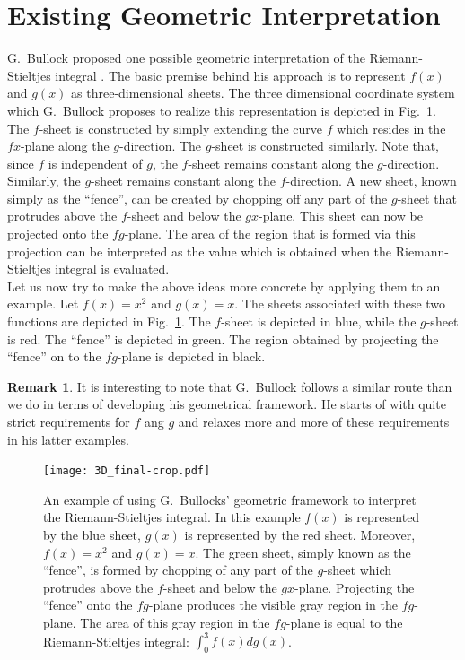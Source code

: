 \documentclass{article}
\theoremstyle{theorem}
\theoremstyle{definition}
\newtheorem*{remark}{Remark}
\begin{document}
\section{Existing Geometric Interpretation}
G.~Bullock proposed one possible geometric interpretation of the Riemann-Stieltjes integral \cite{bullock1988}. 
The basic premise behind his approach is to represent $f(x)$ and $g(x)$ as three-dimensional sheets. 
The three dimensional coordinate system which G.~Bullock proposes to realize this representation is depicted in 
Fig.~\ref{fig:bullock}. The $f$-sheet is constructed by simply extending the curve $f$ which resides in the $fx$-plane 
along the $g$-direction. The $g$-sheet is constructed similarly. Note that, since $f$ is independent of $g$, the $f$-sheet remains 
constant along the $g$-direction. Similarly, the $g$-sheet remains constant along the $f$-direction. 
A new sheet, known simply as the ``fence'', can be created by chopping off any part of the $g$-sheet that protrudes above the 
$f$-sheet and below the $gx$-plane. This sheet can now be projected onto the $fg$-plane. The area of the region that is formed 
via this projection can be interpreted as the value which is obtained when the Riemann-Stieltjes integral is evaluated.\\ 

\noindent
Let us now try to make the above ideas more concrete by applying them to an example. Let $f(x)=x^2$ and 
$g(x)=x$. The sheets associated with these two functions are depicted in Fig.~\ref{fig:bullock}. 
The $f$-sheet is depicted in blue, while the $g$-sheet is red. The ``fence'' is depicted in green. The region
obtained by projecting the ``fence'' on to the $fg$-plane is depicted in black.\\

\noindent
\begin{remark}
It is interesting to note that G.~Bullock follows a similar route than we do in terms of developing his geometrical framework.
He starts of with quite strict requirements for $f$ ang $g$ and relaxes more and more of these requirements in his latter 
examples. 
\end{remark}

\begin{figure}[htb]
\centering
\texttt{[image: 3D\_final-crop.pdf]}
\caption{An example of using G.~Bullocks' geometric framework to interpret the Riemann-Stieltjes integral. In this example 
$f(x)$ is represented by the blue sheet, $g(x)$ is represented by the red sheet. Moreover, $f(x)=x^2$ and $g(x)=x$. The green sheet, simply known as the ``fence'', is formed 
by chopping of any part of the $g$-sheet which protrudes above the $f$-sheet and below the $gx$-plane. Projecting the ``fence''
onto the $fg$-plane produces the visible gray region in the $fg$-plane. The area of this gray region in the $fg$-plane is equal to the Riemann-Stieltjes integral:
$\int_{0}^{3} f(x) dg(x)$.}
\label{fig:bullock}
\end{figure}
\end{document}
